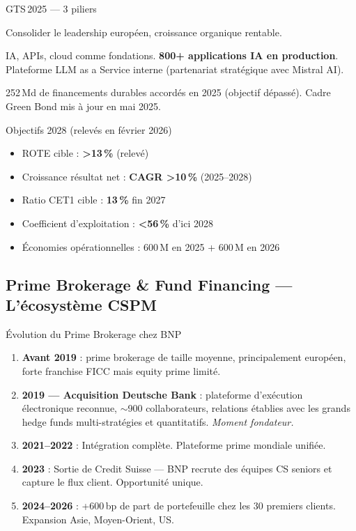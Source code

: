 \documentclass[11pt,a4paper]{article}
\begin{document}
\begin{graybox}{GTS\,2025 --- 3 piliers}
\begin{description}[style=nextline, leftmargin=0.8cm, nosep, itemsep=4pt]
\item[\textbf{Growth}] Consolider le leadership europ\'een, croissance organique rentable.
\item[\textbf{Technology}] IA, APIs, cloud comme fondations. \textbf{800+ applications IA en production}.
Plateforme \og LLM as a Service \fg{} interne (partenariat strat\'egique avec Mistral AI).
\item[\textbf{Sustainability}] 252\,Md\texteuro{} de financements durables accord\'es en 2025
(objectif d\'epass\'e). Cadre Green Bond mis \`a jour en mai 2025.
\end{description}
\end{graybox}

\begin{goodbox}{Objectifs 2028 (relev\'es en f\'evrier 2026)}
\begin{itemize}[nosep, leftmargin=12pt]
\item ROTE cible : \textbf{>13\,\%} (relev\'e)
\item Croissance r\'esultat net : \textbf{CAGR >10\,\%} (2025--2028)
\item Ratio CET1 cible : \textbf{13\,\%} fin 2027
\item Coefficient d'exploitation : \textbf{<56\,\%} d'ici 2028
\item \'Economies op\'erationnelles : 600\,M\texteuro{} en 2025 + 600\,M\texteuro{} en 2026
\end{itemize}
\end{goodbox}

\subsection{Prime Brokerage \& Fund Financing --- L'\'ecosyst\`eme CSPM}

\begin{graybox}{\'Evolution du Prime Brokerage chez BNP}
\begin{enumerate}[nosep, leftmargin=16pt]
\item \textbf{Avant 2019} : prime brokerage de taille moyenne, principalement europ\'een,
forte franchise FICC mais equity prime limit\'e.
\item \textbf{2019 --- Acquisition Deutsche Bank} : plateforme d'ex\'ecution \'electronique
reconnue, $\sim$900 collaborateurs, relations \'etablies avec les grands hedge funds
multi-strat\'egies et quantitatifs. \textit{Moment fondateur.}
\item \textbf{2021--2022} : Int\'egration compl\`ete. Plateforme prime mondiale unifi\'ee.
\item \textbf{2023} : Sortie de Credit Suisse --- BNP recrute des \'equipes CS seniors et
capture le flux client. Opportunit\'e unique.
\item \textbf{2024--2026} : +600\,bp de part de portefeuille chez les 30 premiers clients.
Expansion Asie, Moyen-Orient, US.
\end{enumerate}
\end{graybox}
\end{document}
